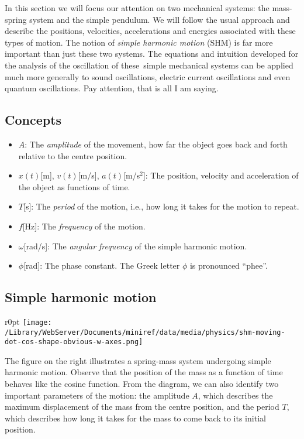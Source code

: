 \documentclass[letterpaper,9pt,journal]{IEEEtran}
\newcommand{\dokuitalic}[1]{\textsl{#1}}
\newcommand{\dokuitem}{\item}
\begin{document}
In this section we will focus our attention on two mechanical systems:
the mass-spring system and the simple pendulum. 
We will follow the usual approach and describe the positions, velocities, accelerations
and energies associated with these types of motion. 
The notion of \dokuitalic{simple harmonic motion} (SHM) is far more important than just these two systems. 
The equations and intuition developed for the analysis of the  oscillation of these simple mechanical 
systems can be applied much more generally to sound oscillations, 
electric current oscillations and even quantum oscillations.
Pay attention, that is all I am saying.

\vspace{-3mm}
\subsection{Concepts}
\label{ff4e01de0bd379280a0157bd102cc5f0}%

\begin{itemize}
\dokuitem  $A$: The \dokuitalic{amplitude} of the movement, how far the object goes back and forth relative to the centre position.
\dokuitem  $x(t)$[m], $v(t)$[m/s], $a(t)$[m/s$^2$]: The position, velocity and acceleration of the object as functions of time.
\dokuitem  $T$[s]: The \dokuitalic{period} of the motion, i.e., how long it takes for the motion to repeat. 
\dokuitem  $f$[Hz]: The \dokuitalic{frequency} of the motion.
\dokuitem  $\omega$[rad/s]: The \dokuitalic{angular frequency} of the simple harmonic motion.
\dokuitem  $\phi$[rad]: The phase constant. The Greek letter $\phi$ is pronounced ``phee''. 
\end{itemize}

\vspace{-3mm}
\subsection{Simple harmonic motion}
\label{cd80db888044ca76c4e83c74b55b1b83}%

\begin{wrapfigure}{r}{0pt}
\texttt{[image: /Library/WebServer/Documents/miniref/data/media/physics/shm-moving-dot-cos-shape-obvious-w-axes.png]}
\end{wrapfigure}

The figure on the right illustrates a spring-mass system undergoing simple harmonic motion. 
Observe that the position of the mass as a function of time behaves like the cosine function. 
From the diagram, we can also identify two important parameters of the motion:  the amplitude $A$, 
which describes the maximum displacement of the mass from the centre position, 
and the period $T$, which describes how long it takes for the mass to come back to its initial position.
\end{document}
